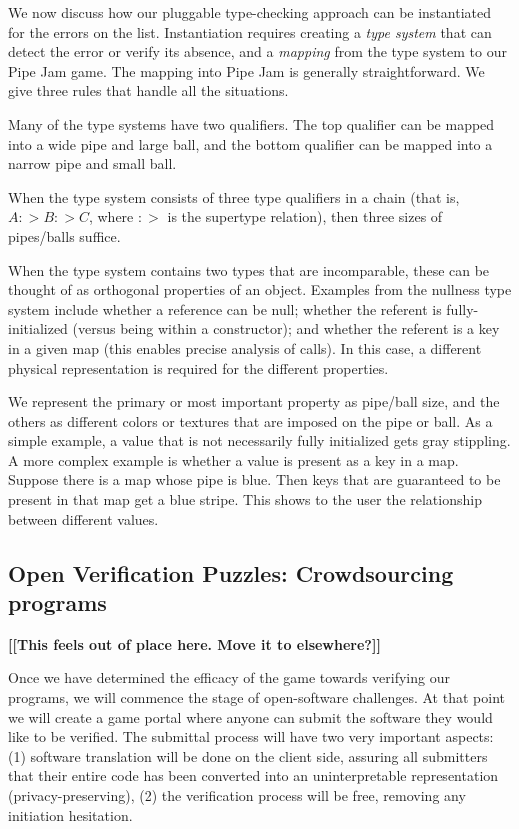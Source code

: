 \documentclass{sig-alternate}
\def\<#1>{\codeid{#1}}
\newcommand{\codeid}[1]{\ifmmode{\mbox{\ttfamily{#1}}}\else{\ttfamily #1}\fi}
\newcommand{\todo}[1]{{\color{red}\bfseries [[#1]]}}
\let\Itemize =\itemize
\def\Nospacing{\itemsep=0pt\topsep=0pt\partopsep=0pt\parskip=0pt\parsep=0pt}
\renewenvironment{itemize}{\Itemize\Nospacing}{\endlist}
\begin{document}
We now discuss how our pluggable type-checking approach can be
instantiated for the errors on the list.  Instantiation requires
creating a \emph{type system} that can detect the error or verify its
absence, and a \emph{mapping} from the type system to our Pipe Jam
game.  The mapping into Pipe Jam is generally straightforward.  We
give three rules that handle all the situations.
%
\begin{itemize}
\item
  Many of the type systems have two qualifiers.  The top qualifier can be
  mapped into a wide pipe and large ball, and the bottom qualifier can be
  mapped into a narrow pipe and small ball.
\item
  When the type system consists of three type qualifiers in a chain (that
  is, $A :> B :> C$, where $:>$ is the supertype relation), then three
  sizes of pipes/balls suffice.
\item
  When the type system contains two types that are incomparable, these
  can be thought of as orthogonal properties of an object.  Examples
  from the nullness type system include whether a reference can be
  null; whether the referent is fully-initialized (versus being
  \<this> within a constructor); and whether the referent is a key in
  a given map (this enables precise analysis of \<Map.get()> calls).
  In this case, a different physical representation is required for
  the different properties.

  We represent the primary or most important property as pipe/ball
  size, and the others as different colors or textures that are
  imposed on the pipe or ball.  As a simple example, a value that is
  not necessarily fully initialized gets gray stippling.  A more
  complex example is whether a value is present as a key in a map.
  Suppose there is a map whose pipe is blue.  Then keys that are
  guaranteed to be present in that map get a blue stripe.  This shows
  to the user the relationship between different values.
\end{itemize}


\subsection{Open Verification Puzzles: Crowdsourcing programs}

\todo{This feels out of place here.  Move it to elsewhere?}

Once we have determined the efficacy of the game towards verifying our
programs, we will commence the stage of open-software challenges.  At
that point we will create a game portal where anyone can submit the
software they would like to be verified.  The submittal process will
have two very important aspects: (1) software translation will be done
on the client side, assuring all submitters that their entire code has
been converted into an uninterpretable representation
(privacy-preserving), (2) the verification process will be free,
removing any initiation hesitation.
\end{document}
